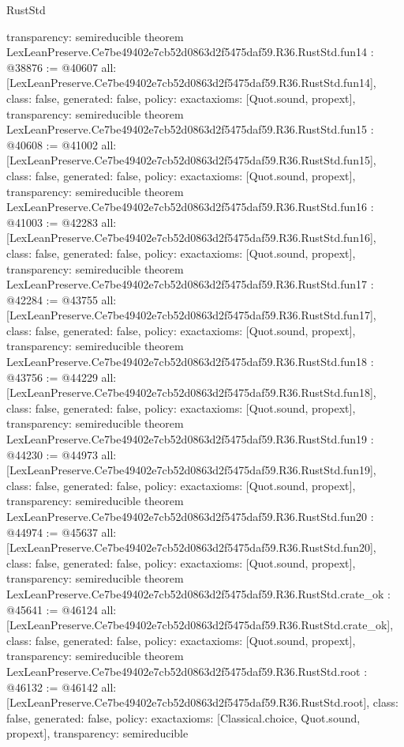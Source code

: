 \begin{lexlean}{RustStd}
\begin{coremodule}
{  transparency: semireducible
}
theorem LexLeanPreserve.Ce7be49402e7cb52d0863d2f5475daf59.R36.RustStd.fun14 : @38876 := @40607 {
  all: [LexLeanPreserve.Ce7be49402e7cb52d0863d2f5475daf59.R36.RustStd.fun14],
  class: false,
  generated: false,
  policy: exact{axioms: [Quot.sound, propext]},
  transparency: semireducible
}
theorem LexLeanPreserve.Ce7be49402e7cb52d0863d2f5475daf59.R36.RustStd.fun15 : @40608 := @41002 {
  all: [LexLeanPreserve.Ce7be49402e7cb52d0863d2f5475daf59.R36.RustStd.fun15],
  class: false,
  generated: false,
  policy: exact{axioms: [Quot.sound, propext]},
  transparency: semireducible
}
theorem LexLeanPreserve.Ce7be49402e7cb52d0863d2f5475daf59.R36.RustStd.fun16 : @41003 := @42283 {
  all: [LexLeanPreserve.Ce7be49402e7cb52d0863d2f5475daf59.R36.RustStd.fun16],
  class: false,
  generated: false,
  policy: exact{axioms: [Quot.sound, propext]},
  transparency: semireducible
}
theorem LexLeanPreserve.Ce7be49402e7cb52d0863d2f5475daf59.R36.RustStd.fun17 : @42284 := @43755 {
  all: [LexLeanPreserve.Ce7be49402e7cb52d0863d2f5475daf59.R36.RustStd.fun17],
  class: false,
  generated: false,
  policy: exact{axioms: [Quot.sound, propext]},
  transparency: semireducible
}
theorem LexLeanPreserve.Ce7be49402e7cb52d0863d2f5475daf59.R36.RustStd.fun18 : @43756 := @44229 {
  all: [LexLeanPreserve.Ce7be49402e7cb52d0863d2f5475daf59.R36.RustStd.fun18],
  class: false,
  generated: false,
  policy: exact{axioms: [Quot.sound, propext]},
  transparency: semireducible
}
theorem LexLeanPreserve.Ce7be49402e7cb52d0863d2f5475daf59.R36.RustStd.fun19 : @44230 := @44973 {
  all: [LexLeanPreserve.Ce7be49402e7cb52d0863d2f5475daf59.R36.RustStd.fun19],
  class: false,
  generated: false,
  policy: exact{axioms: [Quot.sound, propext]},
  transparency: semireducible
}
theorem LexLeanPreserve.Ce7be49402e7cb52d0863d2f5475daf59.R36.RustStd.fun20 : @44974 := @45637 {
  all: [LexLeanPreserve.Ce7be49402e7cb52d0863d2f5475daf59.R36.RustStd.fun20],
  class: false,
  generated: false,
  policy: exact{axioms: [Quot.sound, propext]},
  transparency: semireducible
}
theorem LexLeanPreserve.Ce7be49402e7cb52d0863d2f5475daf59.R36.RustStd.crate_ok : @45641 := @46124 {
  all: [LexLeanPreserve.Ce7be49402e7cb52d0863d2f5475daf59.R36.RustStd.crate_ok],
  class: false,
  generated: false,
  policy: exact{axioms: [Quot.sound, propext]},
  transparency: semireducible
}
theorem LexLeanPreserve.Ce7be49402e7cb52d0863d2f5475daf59.R36.RustStd.root : @46132 := @46142 {
  all: [LexLeanPreserve.Ce7be49402e7cb52d0863d2f5475daf59.R36.RustStd.root],
  class: false,
  generated: false,
  policy: exact{axioms: [Classical.choice, Quot.sound, propext]},
  transparency: semireducible
}


\end{coremodule}
\end{lexlean}
